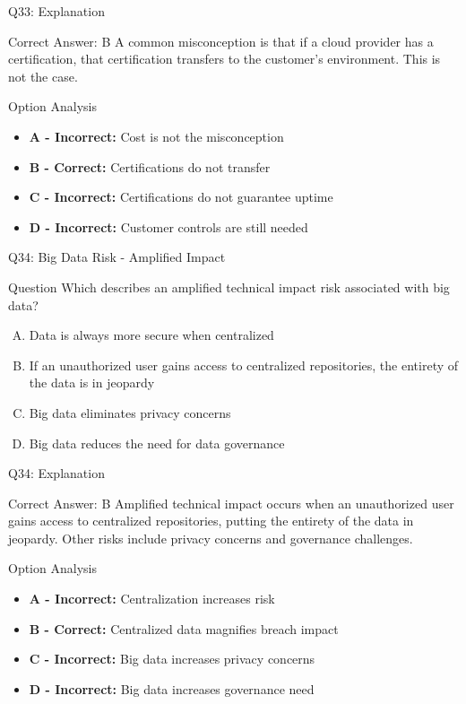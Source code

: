 \documentclass{beamer}
\begin{document}
	\begin{frame}{Q33: Explanation}
		\begin{block}{Correct Answer: B}
			A common misconception is that if a cloud provider has a certification, that certification transfers to the customer's environment. This is not the case.
		\end{block}
		\begin{block}{Option Analysis}
			\begin{itemize}
				\item \textbf{A - Incorrect:} Cost is not the misconception
				\item \textbf{B - Correct:} Certifications do not transfer
				\item \textbf{C - Incorrect:} Certifications do not guarantee uptime
				\item \textbf{D - Incorrect:} Customer controls are still needed
			\end{itemize}
		\end{block}
	\end{frame}
	
	\begin{frame}{Q34: Big Data Risk - Amplified Impact}
		\begin{block}{Question}
			Which describes an amplified technical impact risk associated with big data?
		\end{block}
		\begin{enumerate}[(A)]
			\item Data is always more secure when centralized
			\item If an unauthorized user gains access to centralized repositories, the entirety of the data is in jeopardy
			\item Big data eliminates privacy concerns
			\item Big data reduces the need for data governance
		\end{enumerate}
	\end{frame}
	
	\begin{frame}{Q34: Explanation}
		\begin{block}{Correct Answer: B}
			Amplified technical impact occurs when an unauthorized user gains access to centralized repositories, putting the entirety of the data in jeopardy. Other risks include privacy concerns and governance challenges.
		\end{block}
		\begin{block}{Option Analysis}
			\begin{itemize}
				\item \textbf{A - Incorrect:} Centralization increases risk
				\item \textbf{B - Correct:} Centralized data magnifies breach impact
				\item \textbf{C - Incorrect:} Big data increases privacy concerns
				\item \textbf{D - Incorrect:} Big data increases governance need
			\end{itemize}
		\end{block}
	\end{frame}
	
\end{document}
